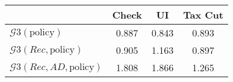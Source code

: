 \begin{tabular}{@{}lccc@{}} 
\toprule 
                          & Check      & UI    & Tax Cut    \\  \midrule 
$\mathcal{G}3(\text{policy})$ & 0.887  & 0.843  & 0.893     \\ 
$\mathcal{G}3(Rec,\text{policy})$ & 0.905  & 1.163  & 0.897     \\ 
$\mathcal{G}3(Rec, AD,\text{policy})$ & 1.808  & 1.866  & 1.265     \\ 
\end{tabular}  
